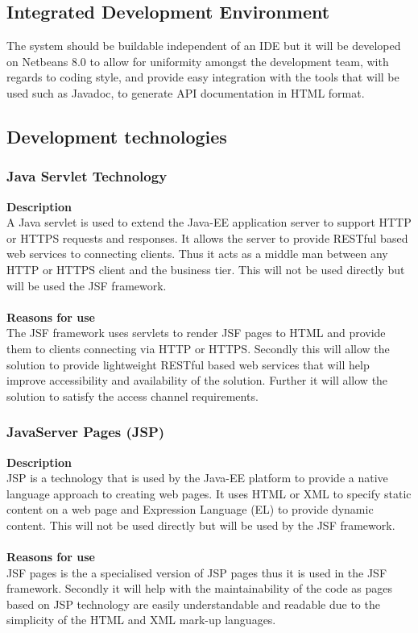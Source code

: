 \documentclass[12pt]{article}
\begin{document}
\subsection{Integrated Development Environment}
The system should be buildable independent of an IDE but it will be developed on Netbeans 8.0 to allow for uniformity amongst the development team, with regards to coding style, and provide easy integration with the tools that will be used such as Javadoc, to generate  API documentation in HTML format.

\subsection{Development technologies}
\subsubsection{Java Servlet Technology}
\textbf{Description}\\
A Java servlet is used to extend the Java-EE application server to support HTTP or HTTPS requests and responses. It allows the server to provide RESTful based web services to connecting clients. Thus it acts as a middle man between any HTTP or HTTPS client and the business tier. This will not be used directly but will be used the JSF framework.\\\\
\textbf{Reasons for use}\\
The JSF framework uses servlets to render JSF pages to HTML and provide them to clients connecting via HTTP or HTTPS. Secondly this will allow the solution to provide lightweight RESTful based web services that will help improve accessibility and availability of the solution. Further it will allow the solution to satisfy the access channel requirements.

\subsubsection{JavaServer Pages (JSP)}
\textbf{Description}\\
JSP is a technology that is used by the Java-EE platform to provide a native language approach to creating web pages. It uses HTML or XML to specify static content on a web page and Expression Language (EL) to provide dynamic content. This will not be used directly but will be used by the JSF framework.\\\\
\textbf{Reasons for use}\\
JSF pages is the a specialised version of JSP pages thus it is used in the JSF framework. Secondly it will help with the maintainability of the code as pages based on JSP technology are easily understandable and readable due to the simplicity of the HTML and XML mark-up languages.    
 
\end{document}
